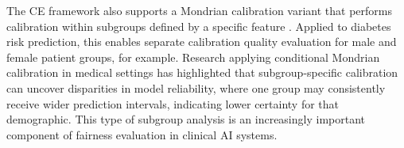 The CE framework also supports a Mondrian calibration variant that performs calibration within subgroups defined by a specific feature \cite{lofstrom_ce_2024}. Applied to diabetes risk prediction, this enables separate calibration quality evaluation for male and female patient groups, for example. Research applying conditional Mondrian calibration in medical settings has highlighted that subgroup-specific calibration can uncover disparities in model reliability, where one group may consistently receive wider prediction intervals, indicating lower certainty for that demographic. This type of subgroup analysis is an increasingly important component of fairness evaluation in clinical AI systems.
